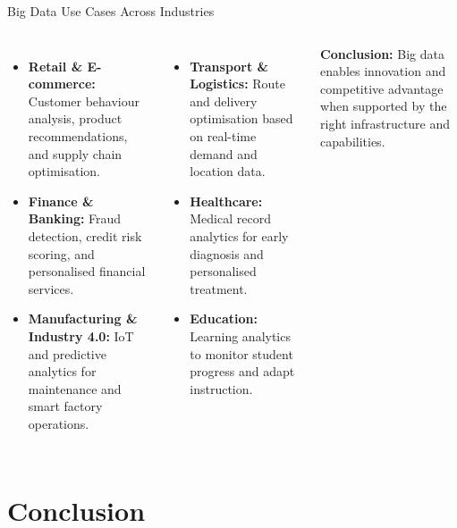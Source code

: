 \documentclass[aspectratio=169, table]{beamer}
\begin{document}
\begin{frame}[fragile]{Big Data Use Cases Across Industries}
	\vspace{20pt}
	\small
	\begin{columns}[T]
		\begin{itemize}
			\item \textbf{Retail \& E-commerce:}  
			Customer behaviour analysis, product recommendations, and supply chain optimisation.
			
			\item \textbf{Finance \& Banking:}  
			Fraud detection, credit risk scoring, and personalised financial services.
			
			\item \textbf{Manufacturing \& Industry 4.0:}  
			IoT and predictive analytics for maintenance and smart factory operations.
		\end{itemize}
		
		\begin{itemize}
			\item \textbf{Transport \& Logistics:}  
			Route and delivery optimisation based on real-time demand and location data.
			
			\item \textbf{Healthcare:}  
			Medical record analytics for early diagnosis and personalised treatment.
			
			\item \textbf{Education:}  
			Learning analytics to monitor student progress and adapt instruction.
		\end{itemize}
		
		\textbf{Conclusion:}  
		Big data enables innovation and competitive advantage when supported by the right infrastructure and capabilities.
	\end{columns}
\end{frame}

\section{Conclusion}
\end{document}
